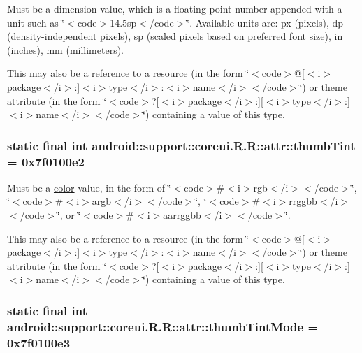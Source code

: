 Must be a dimension value, which is a floating point number appended with a unit such as \char`\"{}$<$code$>$14.5sp$<$/code$>$\char`\"{}. Available units are: px (pixels), dp (density-independent pixels), sp (scaled pixels based on preferred font size), in (inches), mm (millimeters). 

This may also be a reference to a resource (in the form \char`\"{}$<$code$>$@\mbox{[}$<$i$>$package$<$/i$>$:\mbox{]}$<$i$>$type$<$/i$>$:$<$i$>$name$<$/i$>$$<$/code$>$\char`\"{}) or theme attribute (in the form \char`\"{}$<$code$>$?\mbox{[}$<$i$>$package$<$/i$>$:\mbox{]}\mbox{[}$<$i$>$type$<$/i$>$:\mbox{]}$<$i$>$name$<$/i$>$$<$/code$>$\char`\"{}) containing a value of this type. \hypertarget{classandroid_1_1support_1_1coreui_1_1_r_1_1attr_2c24291e5faccd665222d48020869289}{
\subsubsection[{thumbTint}]{\setlength{\rightskip}{0pt plus 5cm}static final int android::support::coreui.R.R::attr::thumbTint = 0x7f0100e2}}
\label{classandroid_1_1support_1_1coreui_1_1_r_1_1attr_2c24291e5faccd665222d48020869289}


Must be a \hyperlink{classandroid_1_1support_1_1coreui_1_1_r_1_1color}{color} value, in the form of \char`\"{}$<$code$>$\#$<$i$>$rgb$<$/i$>$$<$/code$>$\char`\"{}, \char`\"{}$<$code$>$\#$<$i$>$argb$<$/i$>$$<$/code$>$\char`\"{}, \char`\"{}$<$code$>$\#$<$i$>$rrggbb$<$/i$>$$<$/code$>$\char`\"{}, or \char`\"{}$<$code$>$\#$<$i$>$aarrggbb$<$/i$>$$<$/code$>$\char`\"{}. 

This may also be a reference to a resource (in the form \char`\"{}$<$code$>$@\mbox{[}$<$i$>$package$<$/i$>$:\mbox{]}$<$i$>$type$<$/i$>$:$<$i$>$name$<$/i$>$$<$/code$>$\char`\"{}) or theme attribute (in the form \char`\"{}$<$code$>$?\mbox{[}$<$i$>$package$<$/i$>$:\mbox{]}\mbox{[}$<$i$>$type$<$/i$>$:\mbox{]}$<$i$>$name$<$/i$>$$<$/code$>$\char`\"{}) containing a value of this type. \hypertarget{classandroid_1_1support_1_1coreui_1_1_r_1_1attr_76636ca9d100e40c1841bcf88824b085}{
\subsubsection[{thumbTintMode}]{\setlength{\rightskip}{0pt plus 5cm}static final int android::support::coreui.R.R::attr::thumbTintMode = 0x7f0100e3}}
\label{classandroid_1_1support_1_1coreui_1_1_r_1_1attr_76636ca9d100e40c1841bcf88824b085}


